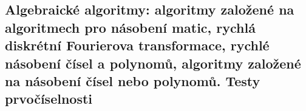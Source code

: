 \subsection{Algebraické algoritmy: algoritmy založené na algoritmech pro násobení matic, rychlá diskrétní Fourierova transformace, rychlé násobení čísel a polynomů, algoritmy založené na násobení čísel nebo polynomů. Testy prvočíselnosti}